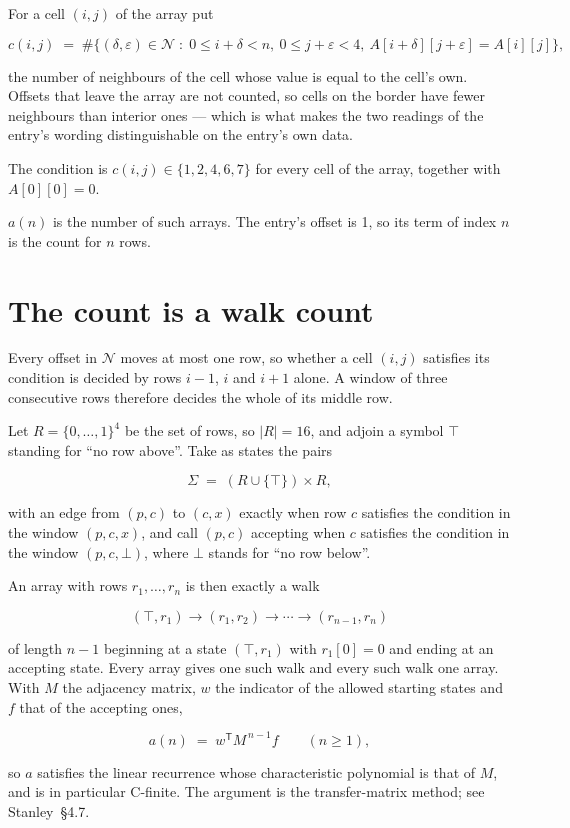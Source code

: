 \documentclass[11pt]{article}
\theoremstyle{definition}
\begin{document}
For a cell $(i,j)$ of the array put

\[c(i,j) \;=\; \#\bigl\{(\delta,\varepsilon)\in\mathcal{N} \;:\; 0\le i+\delta<n,\ 0\le j+\varepsilon<4,\ A[i+\delta][j+\varepsilon] = A[i][j]\bigr\},\]

the number of neighbours of the cell whose value is equal to the cell's own. Offsets that leave the array are not counted, so cells on the border have fewer neighbours than interior ones --- which is what makes the two readings of the entry's wording distinguishable on the entry's own data.

The condition is $c(i,j) \in \{1, 2, 4, 6, 7\}$ for every cell of the array, together with $A[0][0]=0$.

$a(n)$ is the number of such arrays. The entry's offset is 1, so its term of index $n$ is the count for $n$ rows.

\section{The count is a walk count}

Every offset in $\mathcal{N}$ moves at most one row, so whether a cell $(i,j)$ satisfies its condition is decided by rows $i-1$, $i$ and $i+1$ alone. A window of three consecutive rows therefore decides the whole of its middle row.

Let $R = \{0,\dots,1\}^{4}$ be the set of rows, so $|R| = 16$, and adjoin a symbol $\top$ standing for ``no row above''. Take as states the pairs

\[\Sigma \;=\; (R \cup \{\top\}) \times R,\]

with an edge from $(p,c)$ to $(c,x)$ exactly when row $c$ satisfies the condition in the window $(p,c,x)$, and call $(p,c)$ accepting when $c$ satisfies the condition in the window $(p,c,\bot)$, where $\bot$ stands for ``no row below''.

An array with rows $r_1,\dots,r_n$ is then exactly a walk

\[(\top,r_1) \to (r_1,r_2) \to \cdots \to (r_{n-1},r_n)\]

of length $n-1$ beginning at a state $(\top,r_1)$ with $r_1[0]=0$ and ending at an accepting state. Every array gives one such walk and every such walk one array. With $M$ the adjacency matrix, $w$ the indicator of the allowed starting states and $f$ that of the accepting ones,

\[a(n) \;=\; w^{\mathsf T} M^{\,n-1} f \qquad (n \ge 1),\]

so $a$ satisfies the linear recurrence whose characteristic polynomial is that of $M$, and is in particular C-finite. The argument is the transfer-matrix method; see Stanley~\S4.7.
\end{document}
